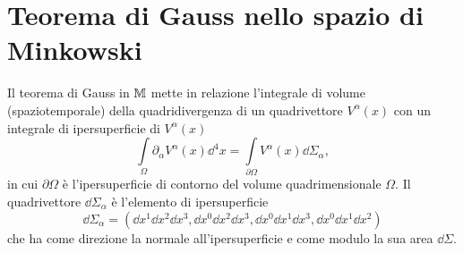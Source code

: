 \cleardoublepage
\chapter{Teorema di Gauss nello spazio di Minkowski}
\label{cha:teorema-gauss}

Il teorema di Gauss in $\mathbb{M}$ mette in relazione
l'integrale di volume (spaziotemporale) della quadridivergenza di un
quadrivettore $V^{\alpha}(x)$ con un integrale di ipersuperficie di
$V^{\alpha}(x)$
\begin{equation}
  \int\limits_{\Omega} \partial_{\alpha}V^{\alpha}(x) \dd^{4} x =
  \int\limits_{\partial\Omega} V^{\alpha}(x) \dd\Sigma_{\alpha},
\end{equation}
in cui $\partial\Omega$ è l'ipersuperficie di contorno del volume
quadrimensionale $\Omega$. Il quadrivettore $\dd\Sigma_{\alpha}$ è l'elemento di
ipersuperficie
\begin{equation}
  \dd\Sigma_{\alpha} = (\dd x^{1}\dd x^{2}\dd x^{3}, \dd x^{0}\dd x^{2}\dd
  x^{3}, \dd x^{0}\dd x^{1}\dd x^{3}, \dd x^{0}\dd x^{1}\dd x^{2})
\end{equation}
che ha come direzione la normale all'ipersuperficie e come modulo la sua area
$\dd\Sigma$.

